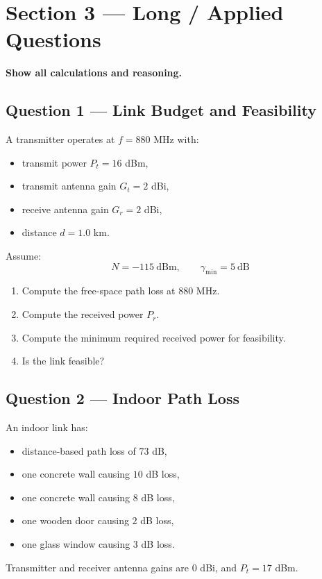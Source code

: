 \documentclass[11pt,a4paper]{article}
\begin{document}
\newpage
\section*{Section 3 --- Long / Applied Questions}
\textbf{Show all calculations and reasoning.}

\subsection*{Question 1 --- Link Budget and Feasibility}
A transmitter operates at $f = 880$ MHz with:
\begin{itemize}[leftmargin=1.2cm]
    \item transmit power $P_t = 16$ dBm,
    \item transmit antenna gain $G_t = 2$ dBi,
    \item receive antenna gain $G_r = 2$ dBi,
    \item distance $d = 1.0$ km.
\end{itemize}

Assume:
\[
N = -115\ \mathrm{dBm}, \qquad \gamma_{\min} = 5\ \mathrm{dB}
\]

\begin{enumerate}[label=\alph*)]
    \item Compute the free-space path loss at 880 MHz.
    \item Compute the received power $P_r$.
    \item Compute the minimum required received power for feasibility.
    \item Is the link feasible?
\end{enumerate}

\subsection*{Question 2 --- Indoor Path Loss}
An indoor link has:
\begin{itemize}[leftmargin=1.2cm]
    \item distance-based path loss of $73$ dB,
    \item one concrete wall causing $10$ dB loss,
    \item one concrete wall causing $8$ dB loss,
    \item one wooden door causing $2$ dB loss,
    \item one glass window causing $3$ dB loss.
    \end{itemize}

Transmitter and receiver antenna gains are $0$ dBi, and $P_t = 17$ dBm.
\end{document}
